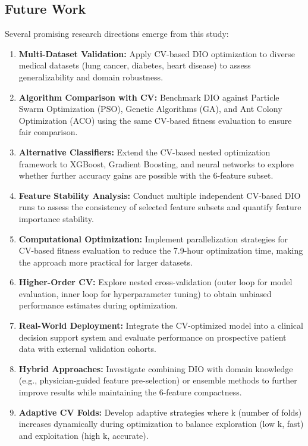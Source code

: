 \documentclass[12pt, a4paper]{article}
\begin{document}
\subsection{Future Work}
Several promising research directions emerge from this study:
\begin{enumerate}
    \item \textbf{Multi-Dataset Validation:} Apply CV-based DIO optimization to diverse medical datasets (lung cancer, diabetes, heart disease) to assess generalizability and domain robustness.
    
    \item \textbf{Algorithm Comparison with CV:} Benchmark DIO against Particle Swarm Optimization (PSO), Genetic Algorithms (GA), and Ant Colony Optimization (ACO) using the same CV-based fitness evaluation to ensure fair comparison.
    
    \item \textbf{Alternative Classifiers:} Extend the CV-based nested optimization framework to XGBoost, Gradient Boosting, and neural networks to explore whether further accuracy gains are possible with the 6-feature subset.
    
    \item \textbf{Feature Stability Analysis:} Conduct multiple independent CV-based DIO runs to assess the consistency of selected feature subsets and quantify feature importance stability.
    
    \item \textbf{Computational Optimization:} Implement parallelization strategies for CV-based fitness evaluation to reduce the 7.9-hour optimization time, making the approach more practical for larger datasets.
    
    \item \textbf{Higher-Order CV:} Explore nested cross-validation (outer loop for model evaluation, inner loop for hyperparameter tuning) to obtain unbiased performance estimates during optimization.
    
    \item \textbf{Real-World Deployment:} Integrate the CV-optimized model into a clinical decision support system and evaluate performance on prospective patient data with external validation cohorts.
    
    \item \textbf{Hybrid Approaches:} Investigate combining DIO with domain knowledge (e.g., physician-guided feature pre-selection) or ensemble methods to further improve results while maintaining the 6-feature compactness.
    
    \item \textbf{Adaptive CV Folds:} Develop adaptive strategies where k (number of folds) increases dynamically during optimization to balance exploration (low k, fast) and exploitation (high k, accurate).
\end{enumerate}
\end{document}
